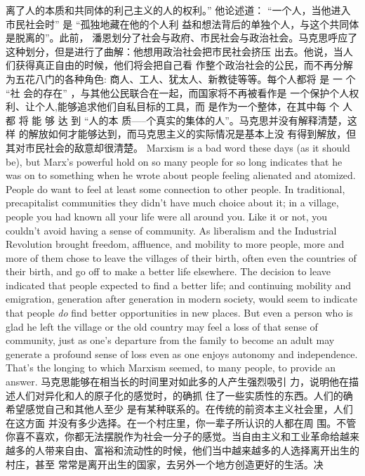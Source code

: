 \begin{paracol}{2}
离了人的本质和共同体的利己主义的人的权利。” 他论述道：
“一个人，当他进入市民社会时” 是 “孤独地藏在他的个人利
益和想法背后的单独个人，与这个共同体是脱离的”。此前，
潘恩划分了社会与政府、市民社会与政治社会。马克思呼应了
这种划分，但是进行了曲解：他想用政治社会把市民社会挤压
出去。他说，当人们获得真正自由的时候，他们将会把自己看
作整个政治社会的公民，而不再分解为五花八门的各种角色:
商人、工人、犹太人、新教徒等等。每个人都将 是 一 个 “社
会的存在” ，与其他公民联合在一起，而国家将不再被看作是
一个保护个人权利、让个人,能够追求他们自私目标的工具，而
是作为一个整体，在其中每 个 人 都 将 能 够 达 到 “人的本
质-----个真实的集体的人”。马克思并没有解释清楚，这样
的解放如何才能够达到，而马克思主义的实际情况是基本上没
有得到解放，但其对市民社会的敌意却很清楚。
\switchcolumn*
Marxism is a bad word these days (as it should be), but
Marx's powerful hold on so many people for so long indicates
that he was on to something when he wrote about people feeling alienated and atomized. People do want to feel at least some
connection to other people. In traditional, precapitalist communities they didn't have much choice about it; in a village,
people you had known all your life were all around you. Like it
or not, you couldn't avoid having a sense of community. As liberalism and the Industrial Revolution brought freedom, affluence, and mobility to more people, more and more of them
chose to leave the villages of their birth, often even the countries of their birth, and go off to make a better life elsewhere.
The decision to leave indicated that people expected to find a
better life; and continuing mobility and emigration, generation
after generation in modern society, would seem to indicate that
people \textit{do} find better opportunities in new places. But even a
person who is glad he left the village or the old country may feel
a loss of that sense of community, just as one's departure from
the family to become an adult may generate a profound sense of
loss even as one enjoys autonomy and independence. That's the
longing to which Marxism seemed, to many people, to provide
an answer.
\switchcolumn
马克思能够在相当长的时间里对如此多的人产生强烈吸引
力，说明他在描述人们对异化和人的原子化的感觉时，的确抓
住了一些实质性的东西。人们的确希望感觉自己和其他人至少
是有某种联系的。在传统的前资本主义社会里，人们在这方面
并没有多少选择。在一个村庄里，你一辈子所认识的人都在周
围。不管你喜不喜欢，你都无法摆脱作为社会一分子的感觉。当自由主义和工业革命给越来越多的人带来自由、富裕和流动性的时候，他们当中越来越多的人选择离开出生的村庄，甚至
常常是离开出生的国家，去另外一个地方创造更好的生活。决

\end{paracol}
